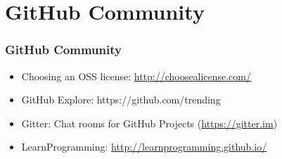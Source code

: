 \section[GitHub Community]{GitHub Community}
\begin{frame}
    \frametitle{GitHub Community}
    
    \begin{itemize}
    \item Choosing an OSS license: \url{http://choosealicense.com/} \pause
    
    \item GitHub Explore: https://github.com/trending \pause
    
    \item Gitter: Chat rooms for GitHub Projects (\url{https://gitter.im})
    
    \item LearnProgramming: \url{http://learnprogramming.github.io/}   
    
    \end{itemize}
\end{frame}
\note{}

